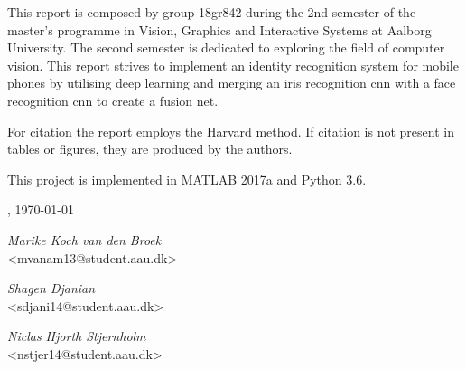 This report is composed by group 18gr842 during the 2nd semester of the master's programme in Vision, Graphics and Interactive Systems at Aalborg University. The second semester is dedicated to exploring the field of computer vision. This report strives to implement an identity recognition system for mobile phones by utilising deep learning and merging an iris recognition \gls{cnn} with a face recognition \gls{cnn} to create a fusion net. 

For citation the report employs the Harvard method. If citation is not present in tables or figures, they are produced by the authors. 

This project is implemented in MATLAB 2017a and Python 3.6. 

\vspace{\baselineskip}\hfill \AAU, \today
\vfill\noindent
\begin{center}
\begin{minipage}[b]{0.45\textwidth}
 \centering
  \textit{Marike Koch van den Broek}\\
  {\footnotesize <mvanam13@student.aau.dk>}
\end{minipage}
\begin{minipage}[b]{0.45\textwidth}
	\centering
	\textit{Shagen Djanian}\\
	{\footnotesize <sdjani14@student.aau.dk>}
\end{minipage}
\hspace{0.3cm}
\vspace{1\baselineskip}

\begin{minipage}[b]{0.45\textwidth}
	\centering
	\textit{Niclas Hjorth Stjernholm}\\
	{\footnotesize <nstjer14@student.aau.dk>}
\end{minipage}

\end{center}

